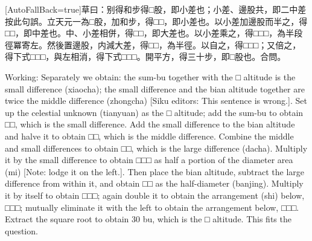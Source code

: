 \documentclass[11pt]{article}
\newcommand{\zhsmall}{\footnotesize\color{black!70}}
\newcommand{\unitlabel}[1]{\marginpar{\raggedleft\tiny\color{gray}#1}}
\newenvironment{unitzh}{\par\CJKfontspec{Noto Serif CJK SC}[AutoFallBack=true]\large\linespread{1.25}\selectfont}{\par}
\newenvironment{uniten}{\par\small\color{black!85}}{\par\medskip}
\begin{document}
\begin{unitzh}\unitlabel{ceyuan-010.2}草曰：别得和步得□股，即小差也；小差、邊股共，即二中差{\zhsmall 按此句誤}。立天元一為□股，加和步，得□□，即小差也。以小差加邊股而半之，得□□，即中差也。中、小差相併，得□□，即大差也。以小差乘之，得□□□，為半段徑冪{\zhsmall 寄左}。然後置邊股，内減大差，得□□，為半徑。以自之，得□□□；又倍之，得下式□□□，與左相消，得下式□□□。開平方，得三十步，即□股也。合問。\end{unitzh}
\begin{uniten}Working: Separately we obtain: the sum-bu together with the □ altitude is the small difference (xiaocha); the small difference and the bian altitude together are twice the middle difference (zhongcha) [Siku editors: This sentence is wrong.]. Set up the celestial unknown (tianyuan) as the □ altitude; add the sum-bu to obtain □□, which is the small difference. Add the small difference to the bian altitude and halve it to obtain □□, which is the middle difference. Combine the middle and small differences to obtain □□, which is the large difference (dacha). Multiply it by the small difference to obtain □□□ as half a portion of the diameter area (mi) [Note: lodge it on the left.]. Then place the bian altitude, subtract the large difference from within it, and obtain □□ as the half-diameter (banjing). Multiply it by itself to obtain □□□; again double it to obtain the arrangement (shi) below, □□□; mutually eliminate it with the left to obtain the arrangement below, □□□. Extract the square root to obtain 30 bu, which is the □ altitude. This fits the question.\end{uniten}
\end{document}
